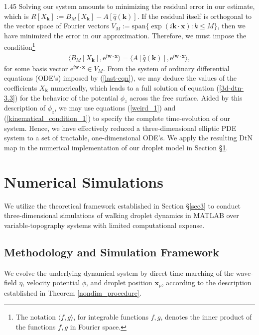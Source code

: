 \documentclass[12pt,titlepage]{article}
\theoremstyle{definition}
\theoremstyle{remark}
\newcommand{\M}[1]{\mathbf{#1}}
\begin{document}
\begin{spacing}{1.45}
Solving our system amounts to minimizing the residual error in our estimate, which is $R[X_{\M{k}}] := B_M [X_{\M{k}}] - A[\hat{q}({\M{k}})]$. If the residual itself is orthogonal to the vector space of Fourier vectors $V_M := \text{span}\{\exp(i \M{k} \cdot \M{x}) : k \leq M\}$, then we have minimized the error in our approximation. Therefore, we must impose the condition\footnote{The notation $\langle f, g \rangle$, for integrable functions $f, g$, denotes the inner product of the functions $f, g$ in Fourier space.}
\begin{align}
\label{last-eqn}
    \langle B_M[X_{\M{k}}],\mathrm{e}^{i \M{w} \cdot \M{x}} \rangle = \langle A[\hat{q}({\M{k}})],\mathrm{e}^{i \M{w} \cdot \M{x}} \rangle,
\end{align} 
for some basis vector $\mathrm{e}^{i \M{w} \cdot \M{x}} \in V_M$. From the system of ordinary differential equations (ODE's) imposed by (\ref{last-eqn}), we may deduce the values of the coefficients $X_{\M{k}}$ numerically, which leads to a full solution of equation (\ref{3d-dtn-3.3}) for the behavior of the potential $\phi_z$ across the free surface. Aided by this description of $\phi_z$, we may use equations (\ref{weird_1}) and (\ref{kinematical_condition_1}) to specify the complete time-evolution of our system. Hence, we have effectively reduced a three-dimensional elliptic PDE system to a set of tractable, one-dimensional ODE's. We apply the resulting DtN map in the numerical implementation of our droplet model in Section §\ref{sec4}.



\section{Numerical Simulations}
\label{sec4}
We utilize the theoretical framework established in Section §\ref{sec3} to conduct three-dimensional simulations of walking droplet dynamics in MATLAB over variable-topography systems with limited computational expense. 
\subsection{Methodology and Simulation Framework}
\label{sec4.1}
We evolve the underlying dynamical system by direct time marching of the wave-field $\eta$, velocity potential $\phi$, and droplet position $\M{x}_p$, according to the description established in Theorem \ref{nondim_procedure}.



\end{spacing}
\end{document}
